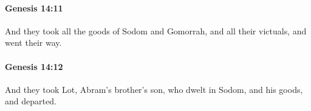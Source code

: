 		\paragraph{Genesis 14:11} %
			\label{GENESIS-14-11}

			And they took all the goods of Sodom and Gomorrah, and all their victuals, and went their way.


		\paragraph{Genesis 14:12} %
			\label{GENESIS-14-12}

			And they took Lot, Abram's brother's son, who dwelt in Sodom, and his goods, and departed.


